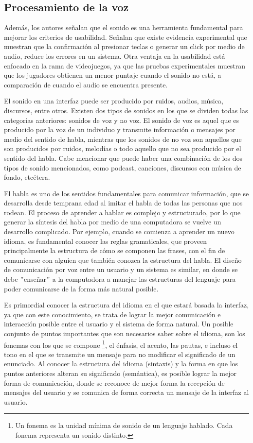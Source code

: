 \subsection{Procesamiento de la voz}
\label{ProcesamientoVozCap3}

Además, los autores señalan que el sonido es una herramienta fundamental para mejorar los criterios de usabilidad. Señalan que existe evidencia experimental que muestran que la confirmación al presionar teclas o generar un click por medio de audio, reduce los errores en un sistema. Otra ventaja en la usabilidad está enfocado en la rama de videojuegos, ya que las pruebas experimentales muestran que los jugadores obtienen un menor puntaje cuando el sonido no está, a comparación de cuando el audio se encuentra presente. 

El sonido en una interfaz puede ser producido por ruidos, audios, música, discursos, entre otros. Existen dos tipos de sonidos en los que se dividen todas las categorías anteriores: sonidos de voz y no voz. El sonido de voz es aquel que es producido por la voz de un individuo y transmite información o mensajes por medio del sentido de habla, mientras que los sonidos de no voz son aquellos que son producidos por ruidos, melodías o todo aquello que no sea producido por el sentido del habla. Cabe mencionar que puede haber una combinación de los dos tipos de sonido mencionados, como podcast, canciones, discursos con música de fondo, etcétera.

El habla es uno de los sentidos fundamentales para comunicar información, que se desarrolla desde temprana edad al imitar el habla de todas las personas que nos rodean. El proceso de aprender a hablar es complejo y estructurado, por lo que generar la síntesis del habla por medio de una computadora se vuelve un desarrollo complicado. Por ejemplo, cuando se comienza a aprender un nuevo idioma, es fundamental conocer las reglas gramaticales, que proveen principalmente la estructura de cómo se componen las frases, con el fin de comunicarse con alguien que también conozca la estructura del habla. El diseño de comunicación por voz entre un usuario y un sistema es similar, en donde se debe $"$enseñar$"$ a la computadora a manejar las estructuras del lenguaje para poder comunicarse de la forma más natural posible.

Es primordial conocer la estructura del idioma en el que estará basada la interfaz, ya que con este conocimiento, se trata de lograr la mejor comunicación e interacción posible entre el usuario y el sistema de forma natural. Un posible conjunto de puntos importantes que son necesarios saber sobre el idioma, son los fonemas con los que se compone \footnote{Un fonema es la unidad mínima de sonido de un lenguaje hablado. Cada fonema representa un sonido distinto.}, el énfasis, el acento, las pautas, e incluso el tono en el que se transmite un mensaje para no modificar el significado de un enunciado. Al conocer la estructura del idioma (sintaxis) y la forma en que los puntos anteriores alteran su significado (semántica), es posible lograr la mejor forma de comunicación, donde se reconoce de mejor forma la recepción de mensajes del usuario y se comunica de forma correcta un mensaje de la interfaz al usuario.

